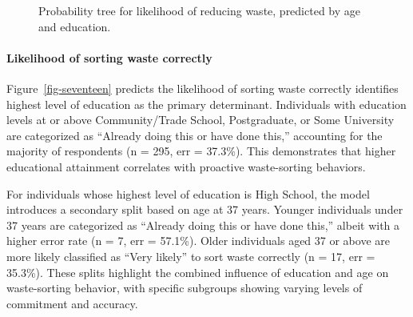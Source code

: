 \documentclass[
  letterpaper,
  DIV=11,
  numbers=noendperiod]{scrartcl}
\let\oldparagraph\paragraph
\renewcommand{\paragraph}[1]{\oldparagraph{#1}\mbox{}}
\begin{document}
\begin{figure}


\caption{\label{fig-sixteen}Probability tree for likelihood of reducing
waste, predicted by age and education.}

\end{figure}%

\paragraph{Likelihood of sorting waste
correctly}\label{likelihood-of-sorting-waste-correctly}

Figure~\ref{fig-seventeen} predicts the likelihood of sorting waste
correctly identifies highest level of education as the primary
determinant. Individuals with education levels at or above
Community/Trade School, Postgraduate, or Some University are categorized
as ``Already doing this or have done this,'' accounting for the majority
of respondents (n = 295, err = 37.3\%). This demonstrates that higher
educational attainment correlates with proactive waste-sorting
behaviors.

For individuals whose highest level of education is High School, the
model introduces a secondary split based on age at 37 years. Younger
individuals under 37 years are categorized as ``Already doing this or
have done this,'' albeit with a higher error rate (n = 7, err = 57.1\%).
Older individuals aged 37 or above are more likely classified as ``Very
likely'' to sort waste correctly (n = 17, err = 35.3\%). These splits
highlight the combined influence of education and age on waste-sorting
behavior, with specific subgroups showing varying levels of commitment
and accuracy.
\end{document}
